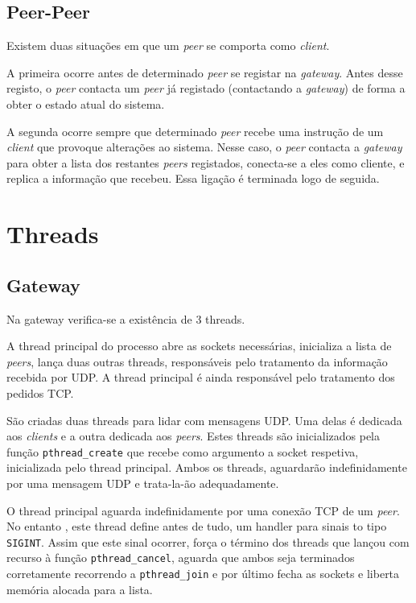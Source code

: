 \documentclass[a4paper, 12pt]{article}
\newcommand{\gateway}{\textit{gateway}\xspace}
\newcommand{\peer}{\textit{peer}\xspace}
\newcommand{\client}{\textit{client}\xspace}
\newcommand{\cliente}{\textit{client}\xspace}
\newcommand{\peers}{\textit{peers}\xspace}
\newcommand{\clientes}{\textit{clients}\xspace}
\begin{document}
\subsection{Peer-Peer}

Existem duas situações em que um \peer se comporta como \cliente.

A primeira ocorre antes de determinado \peer se registar na \gateway. Antes desse registo, o \peer contacta um \peer já registado (contactando a \gateway) de forma a obter o estado atual do sistema.


A segunda ocorre sempre que determinado \peer recebe uma instrução de um \client que provoque alterações ao sistema. Nesse caso, o \peer contacta a \gateway para obter a lista dos restantes \peers registados, conecta-se a eles como cliente, e replica a informação que recebeu. Essa ligação é terminada logo de seguida.




\section{Threads}
\subsection{Gateway}

Na gateway verifica-se a existência de 3 threads.

A thread principal do processo abre as sockets necessárias, inicializa a lista de \peers, lança duas outras threads, responsáveis pelo tratamento da informação recebida por UDP. A thread principal é ainda responsável pelo tratamento dos pedidos TCP.

São criadas duas threads para lidar com mensagens UDP. Uma delas é dedicada aos \clientes e a outra dedicada aos \peers. Estes threads são inicializados pela função 
\texttt{pthread_create} que recebe como argumento a socket respetiva, inicializada pelo thread principal. Ambos os threads, aguardarão indefinidamente por uma mensagem UDP e trata-la-ão adequadamente.

O thread principal aguarda indefinidamente por uma conexão TCP de um \peer. No entanto , este thread define antes de tudo, um handler para sinais to tipo \texttt{SIGINT}. Assim que este sinal ocorrer, força o término dos threads que lançou com recurso à função \texttt{pthread_cancel}, aguarda que ambos seja terminados corretamente recorrendo a \texttt{pthread_join} e por último fecha as sockets e liberta memória alocada para a lista.
\end{document}
